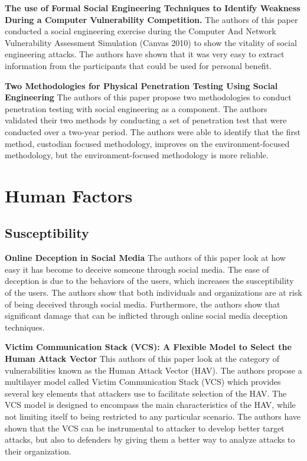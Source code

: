 \documentclass[conference]{IEEEtran}
\begin{document}
\textbf {The use of Formal Social Engineering Techniques to Identify Weakness During a Computer Vulnerability Competition. }
The authors of this paper conducted a social engineering exercise during the Computer And Network Vulnerability Assessment Simulation (Canvas 2010) to show the vitality of social engineering attacks. The authors have shown that it was very easy to extract information from the participants that could be used for personal benefit. 

\textbf {Two Methodologies for Physical Penetration Testing Using Social Engineering}
The authors of this paper propose two methodologies to conduct penetration testing with social engineering as a component. The authors validated their two methods by conducting a set of penetration test that were conducted over a two-year period. The authors were able to identify that the first method, custodian focused methodology, improves on the environment-focused methodology, but the environment-focused methodology is more reliable.  


\section{Human Factors}
\subsection{Susceptibility}
\textbf {Online Deception in Social Media}
The authors of this paper look at how easy it has become to deceive someone through social media. The ease of deception is due to the behaviors of the users, which increases the susceptibility of the users. The authors show that both individuals and organizations are at risk of being deceived through social media.  Furthermore, the authors show that significant damage that can be inflicted through online social media deception techniques.  

\textbf {Victim Communication Stack (VCS): A Flexible Model to Select the Human Attack Vector}
This authors of this paper look at the category of vulnerabilities known as the Human Attack Vector (HAV). The authors propose a multilayer model called Victim Communication Stack (VCS) which provides several key elements that attackers use to facilitate selection of the HAV. The VCS model is designed to encompass the main characteristics of the HAV, while not limiting itself to being restricted to any particular scenario. The authors have shown that the VCS can be instrumental to attacker to develop better target attacks, but also to defenders by giving them a better way to analyze attacks to their organization. 
\end{document}
